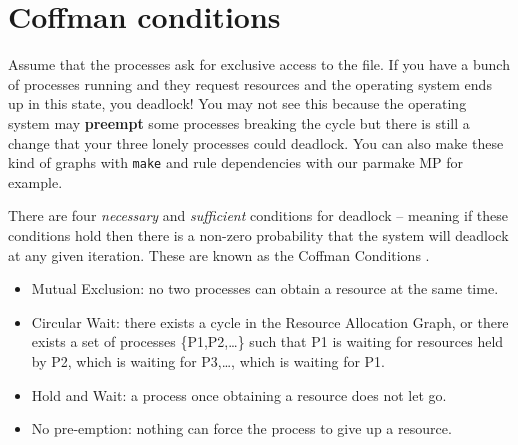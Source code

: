 \section{Coffman conditions}

Assume that the processes ask for exclusive access to the file. If you have a bunch of processes running and they request resources and the operating system ends up in this state, you deadlock! You may not see this because the operating system may \textbf{preempt} some processes breaking the cycle but there is still a change that your three lonely processes could deadlock. You can also make these kind of graphs with \texttt{make} and rule dependencies with our parmake MP for example.

There are four \emph{necessary} and \emph{sufficient} conditions for deadlock -- meaning if these conditions hold then there is a non-zero probability that the system will deadlock at any given iteration. These are known as the \gls{Coffman Conditions} \cite{coffman1971system}.

\begin{itemize}
\tightlist
\item
  \gls{Mutual Exclusion}: no two processes can obtain a resource at the same time.
\item
  \gls{Circular Wait}: there exists a cycle in the Resource Allocation Graph, or there exists a set of processes \{P1,P2,\ldots{}\} such that P1 is waiting for resources held by P2, which is waiting for P3,\ldots{}, which is waiting for P1.
\item
  \gls{Hold and Wait}: a process once obtaining a resource does not let go.
\item
  No \gls{pre-emption}: nothing can force the process to give up a resource.
\end{itemize}

